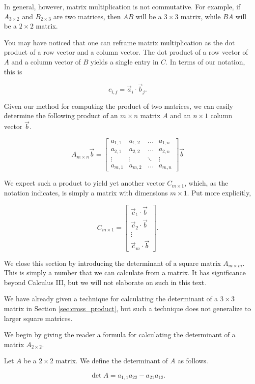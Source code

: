 In general, however, matrix multiplication is not commutative.  For example, if $A_{3\times 2}$ and $B_{2\times 3}$ are two matrices, then $AB$ will be a $3\times 3$ matrix, while $BA$ will be a $2\times 2$ matrix.

You may have noticed that one can reframe matrix multiplication as the dot product of a row vector and a column vector.  The dot product of a row vector of $A$ and a column vector of $B$ yields a single entry in $C$.  In terms of our notation, this is 

\[ c_{i,j} = \vec{a}_i \cdot\vec{b}_j.\]

Given our method for computing the product of two matrices, we can easily determine the following product of an $m\times n$ matrix $A$ and an $n\times 1$ column vector $\vec b$.

\[
	A_{m\times n}\vec{b} =
	\begin{bmatrix}
		a_{1,1} & a_{1,2} & \dots & a_{1,n}\\
		a_{2,1} & a_{2,2} &\dots & a_{2,n}\\
		\vdots & \vdots &\ddots&  \vdots \\
		a_{m,1} & a_{m,2}  & \dots  & a_{m,n}
	\end{bmatrix}
	\vec{b}
\]

We expect such a product to yield yet another vector $C_{m\times 1}$, which, as the notation indicates, is simply a matrix with dimensions $m\times 1$.  Put more explicitly, 

\[C_{m\times 1} = 
\begin{bmatrix}
	\vec{c}_1 \cdot \vec b\\
	\vec{c}_2 \cdot \vec b\\
	\vdots \\
	\vec{c}_m \cdot \vec b
\end{bmatrix}.
\]

We close this section by  introducing the determinant of a square matrix $A_{m\times m}$.  This is simply a number that we can calculate from  a matrix.  It has significance beyond Calculus III, but we will not elaborate on such in this text.  

We have already given a technique for calculating the determinant of a $3\times 3$ matrix in Section \ref{sec:cross_product}, but such a technique does not generalize to larger square matrices.  

We begin by giving the reader a formula for calculating the determinant of a matrix $A_{2\times 2}$.

{Let $A$ be a $2\times 2$ matrix.  We define the determinant of $A$ as follows.

\[\det A = a_{1,1}a_{22} - a_{21}a_{12}.\]
}

